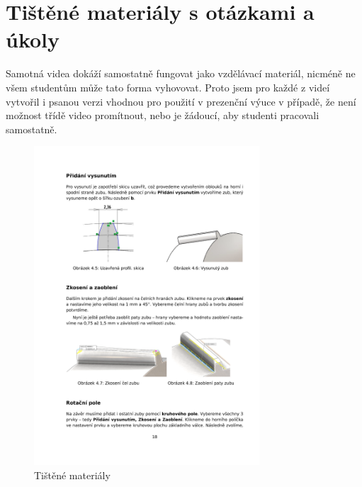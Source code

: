 \section{Tištěné materiály s otázkami a úkoly}
Samotná videa dokáží samostatně fungovat jako vzdělávací materiál, nicméně ne všem studentům může tato forma vyhovovat.
Proto jsem pro každé z videí vytvořil i psanou verzi vhodnou pro použití v prezenční výuce v případě, že není možnost třídě video promítnout, nebo je žádoucí, aby studenti pracovali samostatně.
\begin{figure}[htbp]
    \centering
    \begin{minipage}[b]{0.45\textwidth}
        \centering
        \includegraphics[width=0.75\textwidth]{img/020/guide1.png}
        \caption{Tištěné materiály}
        \label{fig:thumb3}
    \end{minipage}
    \qquad
    \begin{minipage}[b]{0.45\textwidth}
        \centering

\end{minipage}
\end{figure}
